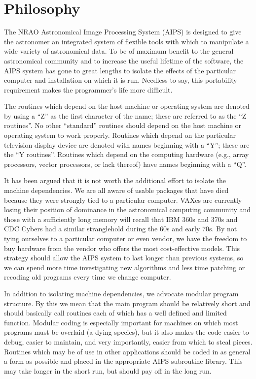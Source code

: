 \section{Philosophy}
The NRAO Astronomical Image Processing System (AIPS) is designed to
give the astronomer an integrated system of flexible tools with which
to manipulate a wide variety of astronomical data.  To be of maximum
benefit to the general astronomical community and to increase the
useful lifetime of the software, the AIPS system has gone to great
lengths to isolate the effects of the particular computer and
installation on which it is run.  Needless to say, this portability
requirement makes the programmer's life more difficult.

The routines which depend on the host machine or operating system are
denoted by using a ``Z'' as the first character of the name; these are
referred to as the ``Z routines''.  No other ``standard'' routines should
depend on the host machine or operating system to work properly.
Routines which depend on the particular television display device are
denoted with names beginning with a ``Y''; these are the ``Y routines''.
Routines which depend on the computing hardware (e.g., array
processors, vector processors, or lack thereof) have names beginning
with a ``Q''.

It has been argued that it is not worth the additional effort to
isolate the machine dependencies.  We are all aware of usable packages
that have died because they were strongly tied to a particular
computer.  VAXes are currently losing their position of dominance in
the astronomical computing community and those with a sufficiently
long memory will recall that IBM 360s and 370s and CDC Cybers had a
similar stranglehold during the 60s and early 70s.  By not tying
ourselves to a particular computer or even vendor, we have the freedom
to buy hardware from the vendor who offers the most cost-effective
models. This strategy should allow the AIPS system to last longer than
previous systems, so we can spend more time investigating new
algorithms and less time patching or recoding old programs every time
we change computer.

In addition to isolating machine dependencies, we advocate modular
program structure.  By this we mean that the main program should be
relatively short and should basically call routines each of which has
a well defined and limited function.  Modular coding is especially
important for machines on which most programs must be overlaid
(a dying species), but it also makes the code easier to
debug, easier to maintain, and  very importantly, easier from which to
steal pieces. Routines which may be of use in other applications
should be coded in as general a form as possible and placed in the
appropriate AIPS subroutine library.  This may take longer in the
short run, but should pay off in the long run.

